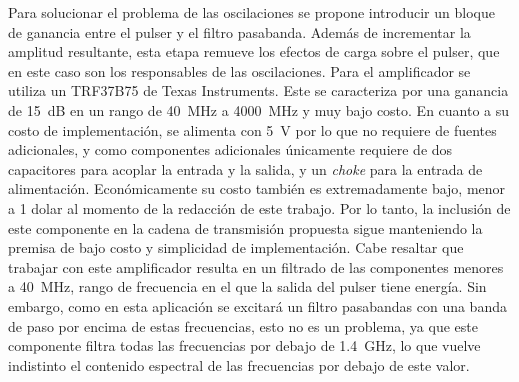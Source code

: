 Para solucionar el problema de las oscilaciones se propone introducir un bloque
de ganancia entre el pulser y el filtro pasabanda. Además de incrementar la
amplitud  resultante, esta etapa remueve los efectos de carga sobre el pulser,
que en este caso son los responsables de las oscilaciones. Para el amplificador
se utiliza un TRF37B75 de Texas Instruments. Este se caracteriza por una
ganancia de \qty{15}{\dB} en un rango de \qty{40}{\mega\hertz} a
\qty{4000}{\mega\hertz} y muy bajo costo. En cuanto a su costo de
implementación, se alimenta con \qty{5}{\volt} por lo que no requiere de fuentes
adicionales, y como componentes adicionales únicamente requiere de dos
capacitores para acoplar la entrada y la salida, y un \textit{choke} para la
entrada de alimentación. Económicamente su costo también es extremadamente bajo,
menor a 1 dolar al momento de la redacción de este trabajo. Por lo tanto, la
inclusión de este componente en la cadena de transmisión propuesta sigue
manteniendo la premisa de bajo costo y simplicidad de implementación. Cabe
resaltar que trabajar con este amplificador resulta en un filtrado de las
componentes menores a \qty{40}{\mega\hertz}, rango de frecuencia en el que la
salida del pulser tiene energía. Sin embargo, como en esta aplicación se
excitará un filtro pasabandas con una banda de paso por encima de estas
frecuencias, esto no es un problema, ya que este componente filtra todas las
frecuencias por debajo de \qty{1.4}{\giga\hertz}, lo que vuelve indistinto el
contenido espectral de las frecuencias por debajo de este valor.

